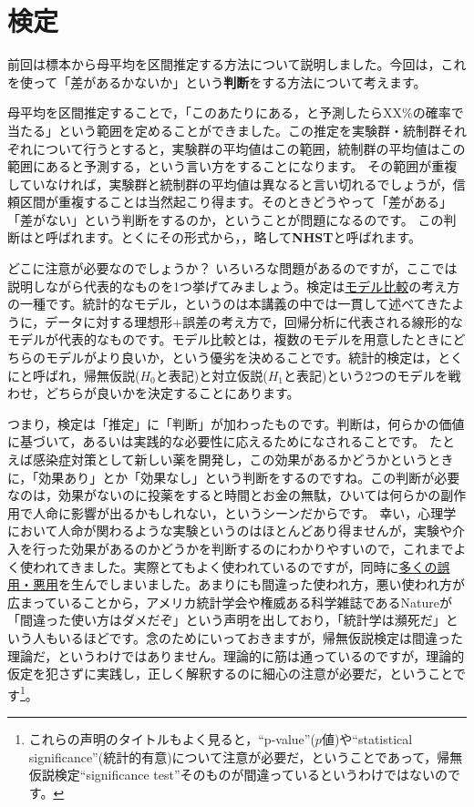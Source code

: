 \documentclass{ltjsbook}
\begin{document}
\chapter{検定}
\label{ch13_NHST}
前回は標本から母平均を区間推定する方法について説明しました。今回は，これを使って「差があるかないか」という\textbf{判断}をする方法について考えます。

母平均を区間推定することで，「このあたりにある，と予測したらXX\%の確率で当たる」という範囲を定めることができました。この推定を実験群・統制群それぞれについて行うとすると，実験群の平均値はこの範囲，統制群の平均値はこの範囲にあると予測する，という言い方をすることになります。
その範囲が重複していなければ，実験群と統制群の平均値は異なると言い切れるでしょうが，信頼区間が重複することは当然起こり得ます。そのときどうやって「差がある」「差がない」という判断をするのか，ということが問題になるのです。
この判断はと呼ばれます。とくにその形式から，，略して\textbf{NHST}と呼ばれます。

\label{sec:13_01}
どこに注意が必要なのでしょうか？ いろいろな問題があるのですが，ここでは説明しながら代表的なものを1つ挙げてみましょう。検定は\underline{モデル比較}の考え方の一種です。統計的なモデル，というのは本講義の中では一貫して述べてきたように，データに対する理想形+誤差の考え方で，回帰分析に代表される線形的なモデルが代表的なものです。モデル比較とは，複数のモデルを用意したときにどちらのモデルがより良いか，という優劣を決めることです。統計的検定は，とくにと呼ばれ，帰無仮説($H_0$と表記)と対立仮説($H_1$と表記)という2つのモデルを戦わせ，どちらが良いかを決定することにあります。

つまり，検定は「推定」に「判断」が加わったものです。判断は，何らかの価値に基づいて，あるいは実践的な必要性に応えるためになされることです。
たとえば感染症対策として新しい薬を開発し，この効果があるかどうかというときに，「効果あり」とか「効果なし」という判断をするのですね。この判断が必要なのは，効果がないのに投薬をすると時間とお金の無駄，ひいては何らかの副作用で人命に影響が出るかもしれない，というシーンだからです。
幸い，心理学において人命が関わるような実験というのはほとんどあり得ませんが，実験や介入を行った効果があるのかどうかを判断するのにわかりやすいので，これまでよく使われてきました。実際とてもよく使われているのですが，同時に\underline{多くの誤用・悪用}を生んでしまいました。あまりにも間違った使われ方，悪い使われ方が広まっていることから，アメリカ統計学会や権威ある科学雑誌であるNatureが「間違った使い方はダメだぞ」という声明を出しており\parencite{Wasserstein2016,amrhein2019scientists}，「統計学は瀕死だ」という人もいるほどです\parencite{Toyoda202003}。念のためにいっておきますが，帰無仮説検定は間違った理論だ，というわけではありません。理論的に筋は通っているのですが，理論的仮定を犯さずに実践し，正しく解釈するのに細心の注意が必要だ，ということです\footnote{これらの声明のタイトルもよく見ると，``p-value''($p$値)や``statistical significance''(統計的有意)について注意が必要だ，ということであって，帰無仮説検定``significance test''そのものが間違っているというわけではないのです。}。
\end{document}
